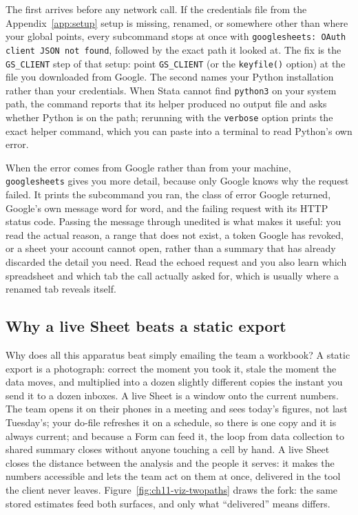 \documentclass[
    a4paper,
    fontsize=10pt,
    twoside=true,
    numbers=noenddot,
]{kaobook}
\begin{document}
The first arrives before any network call. If the credentials file from the Appendix~\ref{app:setup} setup is missing, renamed, or somewhere other than where your global points, every subcommand stops at once with \texttt{googlesheets: OAuth client JSON not found}, followed by the exact path it looked at. The fix is the \texttt{GS\_CLIENT} step of that setup: point \texttt{GS\_CLIENT} (or the \texttt{keyfile()} option) at the file you downloaded from Google. The second names your Python installation rather than your credentials. When Stata cannot find \texttt{python3} on your system path, the command reports that its helper produced no output file and asks whether Python is on the path; rerunning with the \texttt{verbose} option prints the exact helper command, which you can paste into a terminal to read Python's own error.

When the error comes from Google rather than from your machine, \texttt{googlesheets} gives you more detail, because only Google knows why the request failed. It prints the subcommand you ran, the class of error Google returned, Google's own message word for word, and the failing request with its HTTP status code. Passing the message through unedited is what makes it useful: you read the actual reason, a range that does not exist, a token Google has revoked, or a sheet your account cannot open, rather than a summary that has already discarded the detail you need. Read the echoed request and you also learn which spreadsheet and which tab the call actually asked for, which is usually where a renamed tab reveals itself.

\subsection{Why a live Sheet beats a static export}
Why does all this apparatus beat simply emailing the team a workbook? A static export is a photograph: correct the moment you took it, stale the moment the data moves, and multiplied into a dozen slightly different copies the instant you send it to a dozen inboxes. A live Sheet is a window onto the current numbers. The team opens it on their phones in a meeting and sees today's figures, not last Tuesday's; your do-file refreshes it on a schedule, so there is one copy and it is always current; and because a Form can feed it, the loop from data collection to shared summary closes without anyone touching a cell by hand. A live Sheet closes the distance between the analysis and the people it serves: it makes the numbers accessible and lets the team act on them at once, delivered in the tool the client never leaves. Figure~\ref{fig:ch11-viz-twopaths} draws the fork: the same stored estimates feed both surfaces, and only what \enquote{delivered} means differs.
\end{document}
